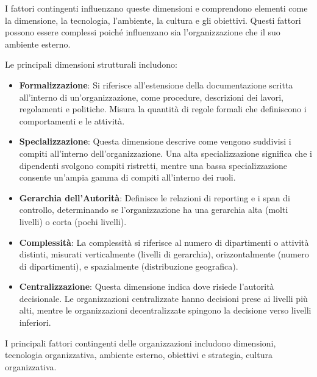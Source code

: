 \documentclass{article}
\begin{document}
    I fattori contingenti influenzano queste dimensioni e comprendono elementi come la dimensione, la tecnologia, l'ambiente, la cultura e gli obiettivi. Questi fattori possono essere complessi poiché influenzano sia l'organizzazione che il suo ambiente esterno.
    
    Le principali dimensioni strutturali includono:
    
    \begin{itemize}
        \item \textbf{Formalizzazione}: Si riferisce all'estensione della documentazione scritta all'interno di un'organizzazione, come procedure, descrizioni dei lavori, regolamenti e politiche. Misura la quantità di regole formali che definiscono i comportamenti e le attività.
        \item \textbf{Specializzazione}: Questa dimensione descrive come vengono suddivisi i compiti all'interno dell'organizzazione. Una alta specializzazione significa che i dipendenti svolgono compiti ristretti, mentre una bassa specializzazione consente un'ampia gamma di compiti all'interno dei ruoli.
        \item \textbf{Gerarchia dell'Autorità}: Definisce le relazioni di reporting e i span di controllo, determinando se l'organizzazione ha una gerarchia alta (molti livelli) o corta (pochi livelli).
        \item \textbf{Complessità}: La complessità si riferisce al numero di dipartimenti o attività distinti, misurati verticalmente (livelli di gerarchia), orizzontalmente (numero di dipartimenti), e spazialmente (distribuzione geografica).
        \item \textbf{Centralizzazione}: Questa dimensione indica dove risiede l'autorità decisionale. Le organizzazioni centralizzate hanno decisioni prese ai livelli più alti, mentre le organizzazioni decentralizzate spingono la decisione verso livelli inferiori.
    \end{itemize}
    
    I principali fattori contingenti delle organizzazioni includono dimensioni, tecnologia organizzativa, ambiente esterno, obiettivi e strategia, cultura organizzativa.
    
\end{document}

